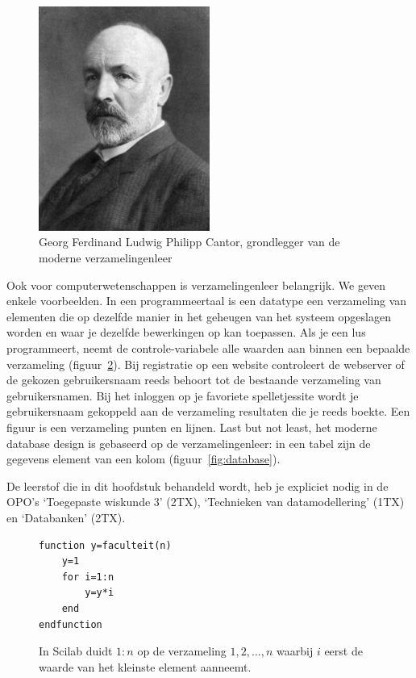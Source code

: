 \begin{figure}[htbp]
\centering
\includegraphics[width=0.5\textwidth]{figuren/verzamelingen_relaties/cantor.jpg}
\caption{Georg Ferdinand Ludwig Philipp Cantor, grondlegger van de moderne verzamelingenleer}
\label{fig:cantor}
\end{figure}
Ook voor computerwetenschappen is verzamelingenleer belangrijk. We geven enkele voorbeelden.  In een programmeertaal is een datatype een verzameling van elementen die op dezelfde manier in het geheugen van het systeem opgeslagen worden en waar je dezelfde bewerkingen op kan toepassen. Als je een lus programmeert, neemt de controle-variabele alle waarden aan binnen een bepaalde verzameling (figuur~\ref{fig:lusScilab}). Bij registratie op een website controleert de webserver of de gekozen gebruikersnaam reeds behoort tot de bestaande verzameling van gebruikersnamen. Bij het inloggen op je favoriete spelletjessite wordt je gebruikersnaam gekoppeld aan de verzameling resultaten die je reeds boekte. Een figuur is een verzameling punten en lijnen. Last but not least, het moderne database design is gebaseerd op de verzamelingenleer: in een tabel zijn de gegevens element van een kolom (figuur~\ref{fig:database}). 

De leerstof die in dit hoofdstuk behandeld wordt, heb je expliciet nodig in de OPO's `Toegepaste wiskunde 3' (2TX), `Technieken van datamodellering' (1TX) en `Databanken' (2TX).

\begin{figure}
\begin{verbatim}
function y=faculteit(n)
    y=1
    for i=1:n
        y=y*i
    end
endfunction
\end{verbatim}
\caption{In Scilab duidt $1:n$ op de  verzameling  $1,2,\dots,n$ waarbij $i$ eerst de waarde van het kleinste element aanneemt.}
\label{fig:lusScilab}
\end{figure}

